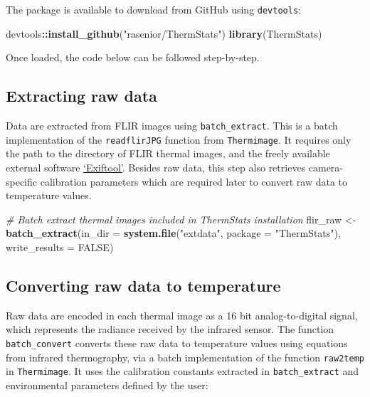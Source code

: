 \documentclass[12pt,british,a4paper,]{article}
\newenvironment{Shaded}{\begin{snugshade}}{\end{snugshade}}
\newcommand{\KeywordTok}[1]{\textcolor[rgb]{0.13,0.29,0.53}{\textbf{#1}}}
\newcommand{\DataTypeTok}[1]{\textcolor[rgb]{0.13,0.29,0.53}{#1}}
\newcommand{\StringTok}[1]{\textcolor[rgb]{0.31,0.60,0.02}{#1}}
\newcommand{\CommentTok}[1]{\textcolor[rgb]{0.56,0.35,0.01}{\textit{#1}}}
\newcommand{\OtherTok}[1]{\textcolor[rgb]{0.56,0.35,0.01}{#1}}
\newcommand{\OperatorTok}[1]{\textcolor[rgb]{0.81,0.36,0.00}{\textbf{#1}}}
\newcommand{\NormalTok}[1]{#1}
\theoremstyle{definition}
\theoremstyle{definition}
\theoremstyle{definition}
\theoremstyle{remark}
\begin{document}
The package is available to download from GitHub using
\texttt{devtools}:

\begin{Shaded}
\begin{Highlighting}[]
\NormalTok{devtools}\OperatorTok{::}\KeywordTok{install_github}\NormalTok{(}\StringTok{"rasenior/ThermStats"}\NormalTok{)}
\KeywordTok{library}\NormalTok{(ThermStats)}
\end{Highlighting}
\end{Shaded}

Once loaded, the code below can be followed step-by-step.

\subsection{Extracting raw data}\label{extracting-raw-data}

Data are extracted from FLIR images using \texttt{batch\_extract}. This
is a batch implementation of the \texttt{readflirJPG} function from
\texttt{Thermimage}. It requires only the path to the directory of FLIR
thermal images, and the freely available external software
\href{https://www.sno.phy.queensu.ca/~phil/exiftool/}{`Exiftool'}.
Besides raw data, this step also retrieves camera-specific calibration
parameters which are required later to convert raw data to temperature
values.

\begin{Shaded}
\begin{Highlighting}[]
\CommentTok{# Batch extract thermal images included in ThermStats installation}
\NormalTok{flir_raw <-}
\StringTok{    }\KeywordTok{batch_extract}\NormalTok{(}\DataTypeTok{in_dir =} \KeywordTok{system.file}\NormalTok{(}\StringTok{"extdata"}\NormalTok{, }
                                       \DataTypeTok{package =} \StringTok{"ThermStats"}\NormalTok{),}
                  \DataTypeTok{write_results =} \OtherTok{FALSE}\NormalTok{)}
\end{Highlighting}
\end{Shaded}

\subsection{Converting raw data to
temperature}\label{converting-raw-data-to-temperature}

Raw data are encoded in each thermal image as a 16 bit analog-to-digital
signal, which represents the radiance received by the infrared sensor.
The function \texttt{batch\_convert} converts these raw data to
temperature values using equations from infrared thermography, via a
batch implementation of the function \texttt{raw2temp} in
\texttt{Thermimage}. It uses the calibration constants extracted in
\texttt{batch\_extract} and environmental parameters defined by the
user:
\end{document}
